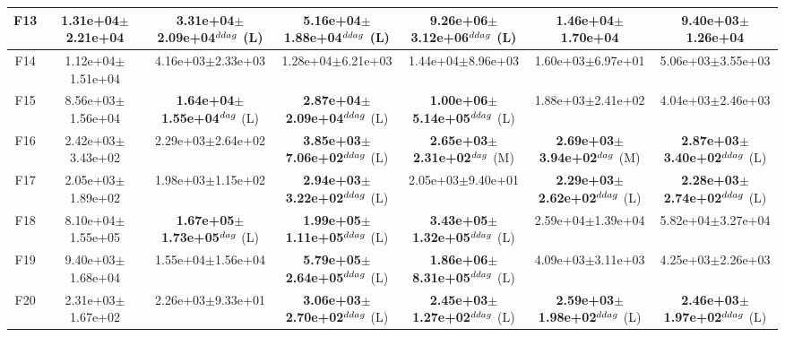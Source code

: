 \begin{table}[!t]
\begin{tabular}{c|cccccc}
F13  & 1.31e+04$\pm$2.21e+04  & \textbf{3.31e+04$\pm$2.09e+04}$^{\\ddag}$ (L)  & \textbf{5.16e+04$\pm$1.88e+04}$^{\\ddag}$ (L)  & \textbf{9.26e+06$\pm$3.12e+06}$^{\\ddag}$ (L)  & 1.46e+04$\pm$1.70e+04   & 9.40e+03$\pm$1.26e+04  \\ \hline
F14  & 1.12e+04$\pm$1.51e+04  & 4.16e+03$\pm$2.33e+03   & 1.28e+04$\pm$6.21e+03   & 1.44e+04$\pm$8.96e+03   & 1.60e+03$\pm$6.97e+01   & 5.06e+03$\pm$3.55e+03  \\ \hline
F15  & 8.56e+03$\pm$1.56e+04  & \textbf{1.64e+04$\pm$1.55e+04}$^{\\dag}$ (L)  & \textbf{2.87e+04$\pm$2.09e+04}$^{\\ddag}$ (L)  & \textbf{1.00e+06$\pm$5.14e+05}$^{\\ddag}$ (L)  & 1.88e+03$\pm$2.41e+02   & 4.04e+03$\pm$2.46e+03  \\ \hline
F16  & 2.42e+03$\pm$3.43e+02  & 2.29e+03$\pm$2.64e+02   & \textbf{3.85e+03$\pm$7.06e+02}$^{\\ddag}$ (L)  & \textbf{2.65e+03$\pm$2.31e+02}$^{\\dag}$ (M)  & \textbf{2.69e+03$\pm$3.94e+02}$^{\\dag}$ (M)  & \textbf{2.87e+03$\pm$3.40e+02}$^{\\ddag}$ (L) \\ \hline
F17  & 2.05e+03$\pm$1.89e+02  & 1.98e+03$\pm$1.15e+02   & \textbf{2.94e+03$\pm$3.22e+02}$^{\\ddag}$ (L)  & 2.05e+03$\pm$9.40e+01   & \textbf{2.29e+03$\pm$2.62e+02}$^{\\ddag}$ (L)  & \textbf{2.28e+03$\pm$2.74e+02}$^{\\ddag}$ (L) \\ \hline
F18  & 8.10e+04$\pm$1.55e+05  & \textbf{1.67e+05$\pm$1.73e+05}$^{\\dag}$ (L)  & \textbf{1.99e+05$\pm$1.11e+05}$^{\\ddag}$ (L)  & \textbf{3.43e+05$\pm$1.32e+05}$^{\\ddag}$ (L)  & 2.59e+04$\pm$1.39e+04   & 5.82e+04$\pm$3.27e+04  \\ \hline
F19  & 9.40e+03$\pm$1.68e+04  & 1.55e+04$\pm$1.56e+04   & \textbf{5.79e+05$\pm$2.64e+05}$^{\\ddag}$ (L)  & \textbf{1.86e+06$\pm$8.31e+05}$^{\\ddag}$ (L)  & 4.09e+03$\pm$3.11e+03   & 4.25e+03$\pm$2.26e+03  \\ \hline
F20  & 2.31e+03$\pm$1.67e+02  & 2.26e+03$\pm$9.33e+01   & \textbf{3.06e+03$\pm$2.70e+02}$^{\\ddag}$ (L)  & \textbf{2.45e+03$\pm$1.27e+02}$^{\\ddag}$ (L)  & \textbf{2.59e+03$\pm$1.98e+02}$^{\\ddag}$ (L)  & \textbf{2.46e+03$\pm$1.97e+02}$^{\\ddag}$ (L) \\ \hline

\end{tabular}
\end{table}
